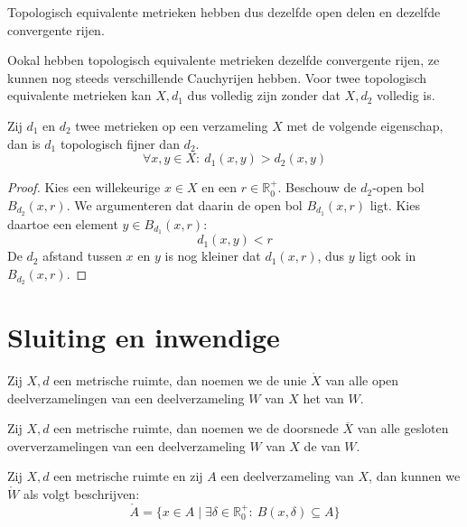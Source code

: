 \documentclass[main.tex]{subfiles}
\begin{document}
\begin{opm}
  Topologisch equivalente metrieken hebben dus dezelfde open delen en dezelfde convergente rijen.
\end{opm}

\begin{opm}
  Ookal hebben topologisch equivalente metrieken dezelfde convergente rijen, ze kunnen nog steeds verschillende Cauchyrijen hebben.
  Voor twee topologisch equivalente metrieken kan $X,d_{1}$ dus volledig zijn zonder dat $X,d_{2}$ volledig is.
\end{opm}

\begin{st}
  Zij $d_{1}$ en $d_{2}$ twee metrieken op een verzameling $X$ met de volgende eigenschap, dan is $d_{1}$ topologisch fijner dan $d_{2}$.
  \[ \forall x,y\in X:\ d_{1}(x,y) > d_{2}(x,y) \]

  \begin{proof}
    Kies een willekeurige $x\in X$ en een $r\in \mathbb{R}_{0}^{+}$.
    Beschouw de $d_{2}$-open bol $B_{d_{2}}(x,r)$.
    We argumenteren dat daarin de open bol $B_{d_{1}}(x,r)$ ligt.
    Kies daartoe een element $y\in B_{d_{1}}(x,r)$:
    \[ d_{1}(x,y) < r \]
    De $d_{2}$ afstand tussen $x$ en $y$ is nog kleiner dat $d_{1}(x,r)$, dus $y$ ligt ook in $B_{d_{2}}(x,r)$.
  \end{proof}
\end{st}


\section{Sluiting en inwendige}
\label{sec:sluit-en-inwend}

\begin{de}
  Zij $X,d$ een metrische ruimte, dan noemen we de unie $\mathring{X}$ van alle open deelverzamelingen van een deelverzameling $W$ van $X$ het  van $W$.
\end{de}

\begin{de}
  Zij $X,d$ een metrische ruimte, dan noemen we de doorsnede $\overline{X}$ van alle gesloten oververzamelingen van een deelverzameling $W$ van $X$ de  van $W$.
\end{de}

\begin{pr}
  Zij $X,d$ een metrische ruimte en zij $A$ een deelverzameling van $X$, dan kunnen we $\mathring{W}$ als volgt beschrijven:
  \[ \mathring{A} = \{ x \in A \mid \exists \delta \in \mathbb{R}_{0}^{+}:\ B(x,\delta) \subseteq A \} \]
\end{pr}
\end{document}
